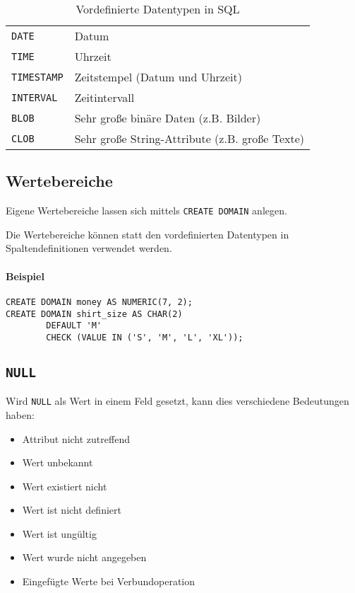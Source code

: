 \begin{table}[H]
\begin{tabular}{l | l}
					\lstinline|DATE|                                                                    & Datum                                                            \\
					\lstinline|TIME|                                                                    & Uhrzeit                                                          \\
					\lstinline|TIMESTAMP|                                                               & Zeitstempel (Datum und Uhrzeit)                                  \\
					\lstinline|INTERVAL|                                                                & Zeitintervall                                                    \\
					\lstinline|BLOB|                                                                    & Sehr große binäre Daten (z.B. Bilder)                            \\
					\lstinline|CLOB|                                                                    & Sehr große String-Attribute (z.B. große Texte)
				\end{tabular}
				\caption{Vordefinierte Datentypen in SQL}
			\end{table}

		\subsection{Wertebereiche} %
			Eigene Wertebereiche lassen sich mittels \lstinline|CREATE DOMAIN| anlegen.

			Die Wertebereiche können statt den vordefinierten Datentypen in Spaltendefinitionen verwendet werden.

			\paragraph{Beispiel}
				\begin{lstlisting}
CREATE DOMAIN money AS NUMERIC(7, 2);
CREATE DOMAIN shirt_size AS CHAR(2)
		DEFAULT 'M'
		CHECK (VALUE IN ('S', 'M', 'L', 'XL'));
            	\end{lstlisting}

		\subsection{\lstinline|NULL|} %
			Wird \lstinline|NULL| als Wert in einem Feld gesetzt, kann dies verschiedene Bedeutungen haben:
			\begin{itemize}
				\item Attribut nicht zutreffend
				\item Wert unbekannt
				\item Wert existiert nicht
				\item Wert ist nicht definiert
				\item Wert ist ungültig
				\item Wert wurde nicht angegeben
				\item Eingefügte Werte bei Verbundoperation
			\end{itemize}

